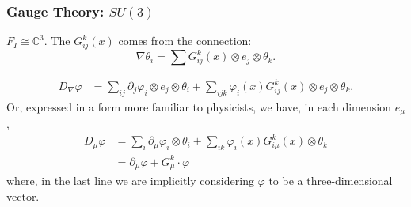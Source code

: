 \documentclass{beamer}
\begin{document}


\begin{frame}


\frametitle{Gauge Theory: $SU(3)$}


 $F_I \cong \mathbb{C}^3$. The  $G_{ij}^k(x)$ comes from the connection:
\begin{equation}
\nabla \theta_i = \sum G_{ij}^k(x) \otimes e_j \otimes \theta_k.
\end{equation}

\begin{align*}
D_\nabla \varphi 
&= \sum_{ij} \partial_j \varphi_i \otimes e_j \otimes \theta_i + \sum_{ijk} \varphi_i(x)  G_{ij}^k(x) \otimes e_j \otimes \theta_k.
\end{align*}
Or, expressed in a form more familiar to physicists, we have, in each dimension $e_\mu$,
\begin{align*}
D_\mu \varphi
&= \sum_{i} \partial_\mu \varphi_i \otimes \theta_i + \sum_{ik} \varphi_i(x)  G_{i\mu}^k(x) \otimes \theta_k \\
&= \partial_\mu \varphi + G_\mu^k \cdot \varphi
\end{align*}
where, in the last line we are implicitly considering $\varphi$ to be a three-dimensional vector.


\end{frame}


\end{document}
